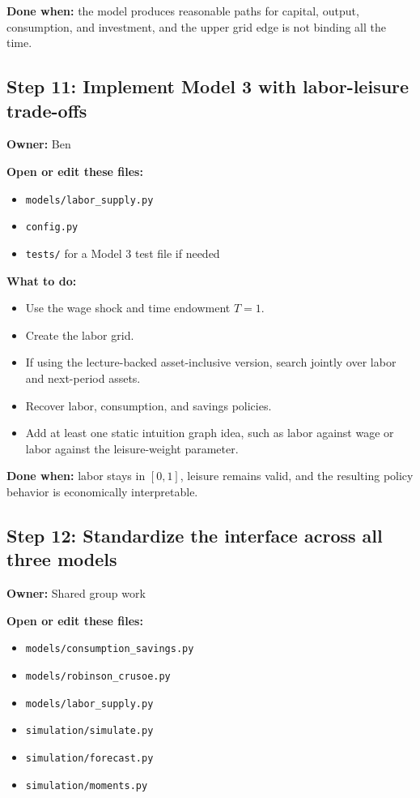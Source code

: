 \documentclass[11pt]{article}
\begin{document}
\textbf{Done when:} the model produces reasonable paths for capital, output, consumption, and investment, and the upper grid edge is not binding all the time.

\subsection{Step 11: Implement Model 3 with labor-leisure trade-offs}
\textbf{Owner:} Ben

\textbf{Open or edit these files:}
\begin{itemize}
    \item \texttt{models/labor\_supply.py}
    \item \texttt{config.py}
    \item \texttt{tests/} for a Model 3 test file if needed
\end{itemize}

\textbf{What to do:}
\begin{itemize}
    \item Use the wage shock and time endowment \(T=1\).
    \item Create the labor grid.
    \item If using the lecture-backed asset-inclusive version, search jointly over labor and next-period assets.
    \item Recover labor, consumption, and savings policies.
    \item Add at least one static intuition graph idea, such as labor against wage or labor against the leisure-weight parameter.
\end{itemize}

\textbf{Done when:} labor stays in \([0,1]\), leisure remains valid, and the resulting policy behavior is economically interpretable.

\subsection{Step 12: Standardize the interface across all three models}
\textbf{Owner:} Shared group work

\textbf{Open or edit these files:}
\begin{itemize}
    \item \texttt{models/consumption\_savings.py}
    \item \texttt{models/robinson\_crusoe.py}
    \item \texttt{models/labor\_supply.py}
    \item \texttt{simulation/simulate.py}
    \item \texttt{simulation/forecast.py}
    \item \texttt{simulation/moments.py}
\end{itemize}
\end{document}
